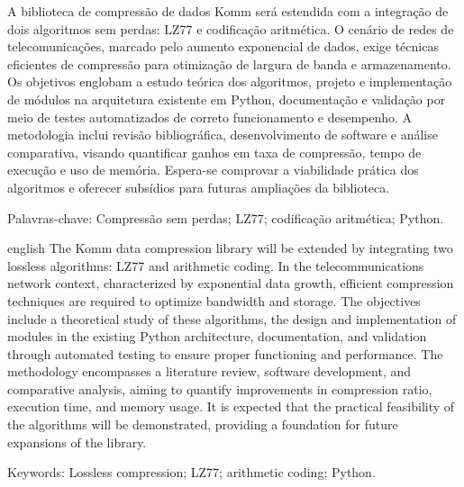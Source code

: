 \setlength{\absparsep}{18pt} 


\begin{resumo}

A biblioteca de compressão de dados Komm será estendida com a integração de dois algoritmos sem perdas: LZ77 e codificação aritmética. O cenário de redes de telecomunicações, marcado pelo aumento exponencial de dados, exige técnicas eficientes de compressão para otimização de largura de banda e armazenamento. Os objetivos englobam a estudo teórica dos algoritmos, projeto e implementação de módulos na arquitetura existente em Python, documentação e validação por meio de testes automatizados de correto funcionamento e desempenho. A metodologia inclui revisão bibliográfica, desenvolvimento de software e análise comparativa, visando quantificar ganhos em taxa de compressão, tempo de execução e uso de memória. Espera-se comprovar a viabilidade prática dos algoritmos e oferecer subsídios para futuras ampliações da biblioteca.

    
    Palavras-chave: Compressão sem perdas; LZ77; codificação aritmética; Python.
\end{resumo}



\begin{resumo}[Abstract]
\begin{otherlanguage*}{english}
The Komm data compression library will be extended by integrating two lossless algorithms: LZ77 and arithmetic coding. In the telecommunications network context, characterized by exponential data growth, efficient compression techniques are required to optimize bandwidth and storage. The objectives include a theoretical study of these algorithms, the design and implementation of modules in the existing Python architecture, documentation, and validation through automated testing to ensure proper functioning and performance. The methodology encompasses a literature review, software development, and comparative analysis, aiming to quantify improvements in compression ratio, execution time, and memory usage. It is expected that the practical feasibility of the algorithms will be demonstrated, providing a foundation for future expansions of the library.\vspace{\onelineskip}

\noindent 
Keywords: Lossless compression; LZ77; arithmetic coding; Python.


\end{otherlanguage*}
\end{resumo}

